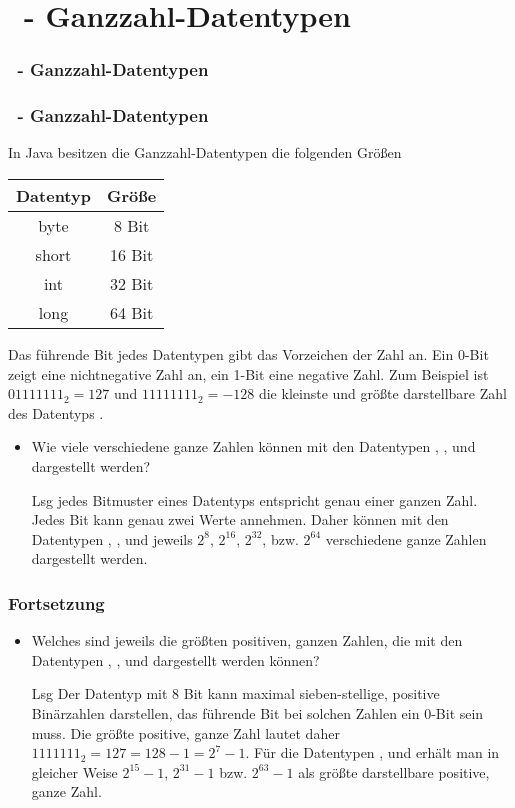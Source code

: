 \def\stitle{\theexercise\ - Ganzzahl-Datentypen}
\section{\stitle}
\begin{frame}%
  \frametitle{\stitle}
\tableofcontents[current]
\end{frame}

\begin{frame}[fragile]%
    \frametitle{\stitle}%

In Java besitzen die Ganzzahl-Datentypen die folgenden Größen
\begin{center}
\begin{tabular}{|c|c|}
\hline
\textbf{Datentyp} & \textbf{Größe} \\
\hline
byte  &  8 Bit \\
short & 16 Bit \\
int   & 32 Bit \\
long  & 64 Bit \\
\hline
\end{tabular}
\end{center}
Das führende Bit jedes Datentypen gibt das Vorzeichen der Zahl an.
Ein 0-Bit zeigt eine nichtnegative Zahl an, ein 1-Bit eine negative Zahl.
Zum Beispiel ist $0111 1111_2=127$ und $11111111_2 = -128$ die kleinste und größte darstellbare Zahl des Datentyps .
\begin{itemize}
\item Wie viele verschiedene ganze Zahlen können mit den Datentypen , ,  und  dargestellt werden?

\item[Lsg]
jedes Bitmuster eines Datentyps entspricht genau einer ganzen Zahl.
Jedes Bit kann genau zwei Werte annehmen.
Daher können mit den Datentypen , ,  und  jeweils $2^8$, $2^{16}$, $2^{32}$, bzw. $2^{64}$ verschiedene ganze Zahlen dargestellt werden.

\end{itemize}

\end{frame}

\begin{frame}[fragile]%
  \frametitle{Fortsetzung}%
\centering
\medskip

\begin{itemize}
\item
Welches sind jeweils die größten positiven, ganzen Zahlen, die mit den Datentypen , ,  und  dargestellt werden können?
\item[Lsg]
Der Datentyp  mit 8 Bit kann maximal sieben-stellige, positive Binärzahlen darstellen, das führende Bit bei solchen Zahlen ein 0-Bit sein muss.
Die größte positive, ganze Zahl lautet daher $1111111_2 = 127 = 128 - 1 = 2^7 - 1$.
Für die Datentypen ,  und  erhält man in gleicher Weise $2^{15} - 1$, $2^{31} - 1$ bzw. $2^{63} - 1$ als größte darstellbare positive, ganze Zahl.
\end{itemize}

\end{frame}

